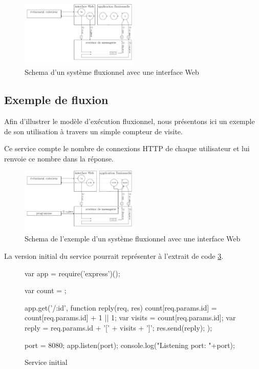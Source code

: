 \begin{figure}[h!]
	\includegraphics[width=0.5\textwidth]{schema-web.pdf}
	\caption{Schema d'un système fluxionnel avec une interface Web}
	\label{fig:schemaweb}
\end{figure}


\subsection{Exemple de fluxion}

Afin d'illustrer le modèle d'exécution fluxionnel, nous présentons ici un exemple de son utilisation à travers un simple compteur de visite.

Ce service compte le nombre de connexions HTTP de chaque utilisateur et lui renvoie ce nombre dans la réponse.

\begin{figure}[h!]
  \includegraphics[width=0.5\textwidth]{schema-example.pdf}
  \caption{Schema de l'exemple d'un système fluxionnel avec une interface Web}
  \label{fig:example}
\end{figure}

La version initial du service pourrait représenter à l'extrait de code \ref{lst:classique}.

\begin{figure}
  \begin{code}
  var app = require('express')();

  var count = {};

  app.get('/:id', function reply(req, res){
    count[req.params.id] = count[req.params.id] + 1  || 1;
    var visits = count[req.params.id];
    var reply = req.params.id + '[' + visits + ']';
    res.send(reply);
  });

  port = 8080;
  app.listen(port);
  console.log("Listening port: "+port);
  \end{code}
  \caption{Service initial}
  \label{lst:classique}
\end{figure}

